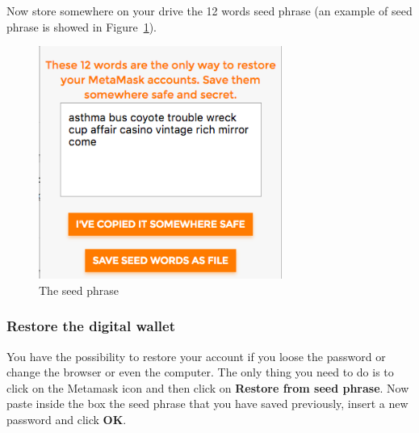 Now store somewhere on your drive the 12 words seed phrase (an example of seed phrase is showed in Figure~\ref{fig:seed}).
\begin{figure}[!h]
	\centering
	\includegraphics[height=3in]{img/seed.png}
	\caption{The seed phrase}
	\label{fig:seed}
\end{figure}


\subsubsection{Restore the digital wallet}
You have the possibility to restore your account if you loose the password or change the browser or even the computer. The only thing you need to do is to click on the Metamask icon and then click on \textbf{Restore from seed phrase}. Now paste inside the box the seed phrase that you have saved previously, insert a new password and click \textbf{OK}.

